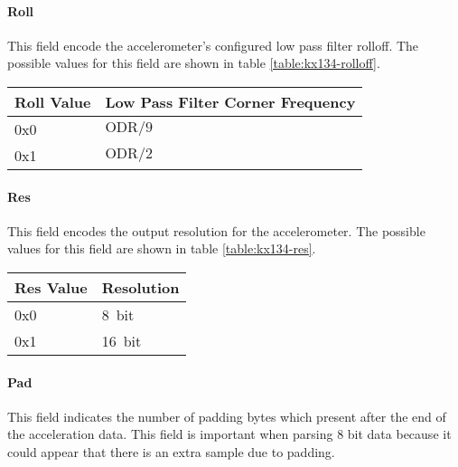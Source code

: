 \paragraph{Roll}
This field encode the accelerometer's configured low pass filter rolloff. The
possible values for this field are shown in table \ref{table:kx134-rolloff}.

\begin{table*}[htb]
\centering
\begin{tabular}{@{}ll@{}}
\toprule
Roll Value &   Low Pass Filter Corner Frequency \\
\midrule
0x0        &   $\text{ODR} / 9$ \\
0x1        &   $\text{ODR} / 2$ \\
\bottomrule
\end{tabular}
\caption{KX134-1211 Low Pass Filter Rolloff Values}
\label{table:kx134-rolloff}
\end{table*}

\paragraph{Res}
This field encodes the output resolution for the accelerometer. The possible
values for this field are shown in table \ref{table:kx134-res}.

\begin{table*}[htb]
\centering
\begin{tabular}{@{}ll@{}}
\toprule
Res Value  &   Resolution \\
\midrule
0x0        &   {\SI{8}{bit}} \\
0x1        &   {\SI{16}{bit}} \\
\bottomrule
\end{tabular}
\caption{KX134-1211 Resolution Values}
\label{table:kx134-res}
\end{table*}

\paragraph{Pad}
This field indicates the number of padding bytes which present after the end of
the acceleration data. This field is important when parsing 8 bit data because
it could appear that there is an extra sample due to padding.

